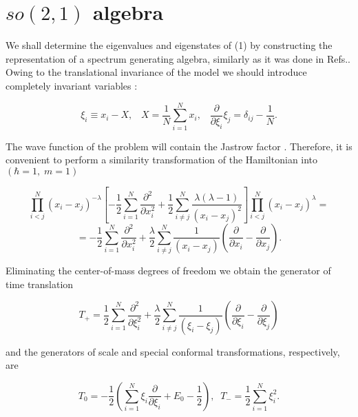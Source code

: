 \documentclass[a4paper,preprint,aps]{revtex4}
\begin{document}
\section{$so(2,1)$ algebra}

We shall determine the eigenvalues and eigenstates of (1) by constructing the
 representation of a spectrum generating algebra, similarly as it was done 
in Refs.\cite{AJ,GMP}. Owing to the translational invariance of the model we
 should introduce completely invariant variables \cite{P}:


\begin{equation}
	\xi_{i} \equiv x_{i}-X,\; \; \;
	X=\frac{1}{N}\sum_{i=1}^{N}x_i,\; \; \;
	\frac{\partial}{\partial \xi_{i}}\xi_{j}=\delta_{ij}-\frac{1}{N}.  
\end{equation}

The wave function of the problem will contain the Jastrow factor . 
Therefore, it is convenient to perform a similarity transformation of the 
Hamiltonian into $(\hbar =1,\;m=1)$ 


\[	\prod_{i<j}^{N}(x_{i}-x_{j})^{-\lambda}
	\left[
	- \frac{1}{2} \sum_{i=1}^{N} \frac {\partial ^{2}}{\partial x_{i}^2} +
	\frac{1}{2} \sum_{i\neq j}^{N} 
	\frac {\lambda(\lambda-1)}{(x_{i}-x_{j})^{2}}
	\right]
	\prod_{i<j}^{N}(x_{i}-x_{j})^{\lambda}=\]
\begin{equation}
	= -\frac{1}{2} \sum_{i=1}^{N} \frac {\partial ^{2}}{\partial x_{i}^2} +
	\frac{\lambda}{2} \sum_{i\neq j}^{N} \frac {1}{(x_{i}-x_{j})}
	\left(
	\frac{\partial}{\partial x_{i}}-\frac {\partial}{\partial x_{j}}
	\right) .
\end{equation}

Eliminating the center-of-mass degrees of freedom we obtain the generator of
 time translation


\begin{equation}
	T_{+}=
	 \frac{1}{2} \sum_{i=1}^{N} \frac {\partial ^{2}}{\partial \xi_{i}^2} +
	\frac{\lambda}{2} \sum_{i\neq j}^{N} \frac {1}{(\xi_{i}-\xi_{j})}
	\left(
	\frac{\partial}{\partial \xi_{i}}-\frac {\partial}{\partial \xi_{j}}
	\right)
\end{equation}

and the generators of scale and special conformal transformations,
 respectively, are

\begin{equation}
	T_{0}=-\frac{1}{2}
	\left(
	\sum_{i=1}^{N} \xi_{i} \frac {\partial}
	{\partial \xi_{i}}+E_{0}-\frac{1}{2}
	\right),\;\;
	 T_{-}=\frac{1}{2}\sum_{i=1}^{N} \xi_{i}^{2}.
\end{equation}
\end{document}
